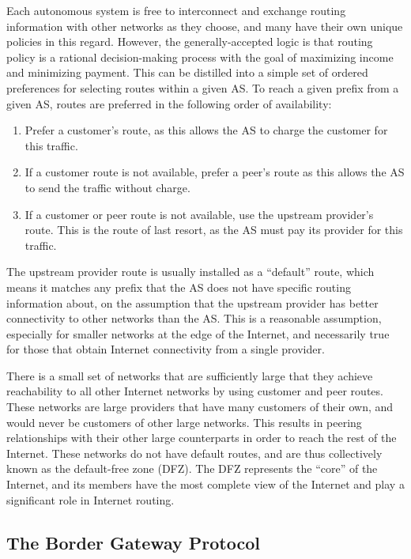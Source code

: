 Each autonomous system is free to interconnect and exchange routing information
with other networks as they choose, and many have their own unique policies in
this regard. However, the generally-accepted logic is that routing policy is a
rational decision-making process with the goal of maximizing income and
minimizing payment. This can be distilled into a simple set of ordered
preferences for selecting routes within a given AS. To reach a given prefix
from a given AS, routes are preferred in the following order of availability:

\begin{enumerate}
    \item{Prefer a customer's route, as this allows the AS to charge the
    customer for this traffic.}
    \item{If a customer route is not available, prefer a peer's route as this
    allows the AS to send the traffic without charge.}
    \item{If a customer or peer route is not available, use the upstream
    provider's route. This is the route of last resort, as the AS must pay its
    provider for this traffic.}
\end{enumerate}

The upstream provider route is usually installed as a ``default'' route, which
means it matches any prefix that the AS does not have specific routing
information about, on the assumption that the upstream provider has better
connectivity to other networks than the AS. This is a reasonable assumption,
especially for smaller networks at the edge of the Internet, and necessarily
true for those that obtain Internet connectivity from a single provider.

There is a small set of networks that are sufficiently large that they achieve
reachability to all other Internet networks by using customer and peer routes.
These networks are large providers that have many customers of their own, and
would never be customers of other large networks. This results in peering
relationships with their other large counterparts in order to reach the rest of
the Internet. These networks do not have default routes, and are thus
collectively known as the default-free zone (DFZ). The DFZ represents the
``core'' of the Internet, and its members have the most complete view of the
Internet and play a significant role in Internet routing.

\subsection{The Border Gateway Protocol}

